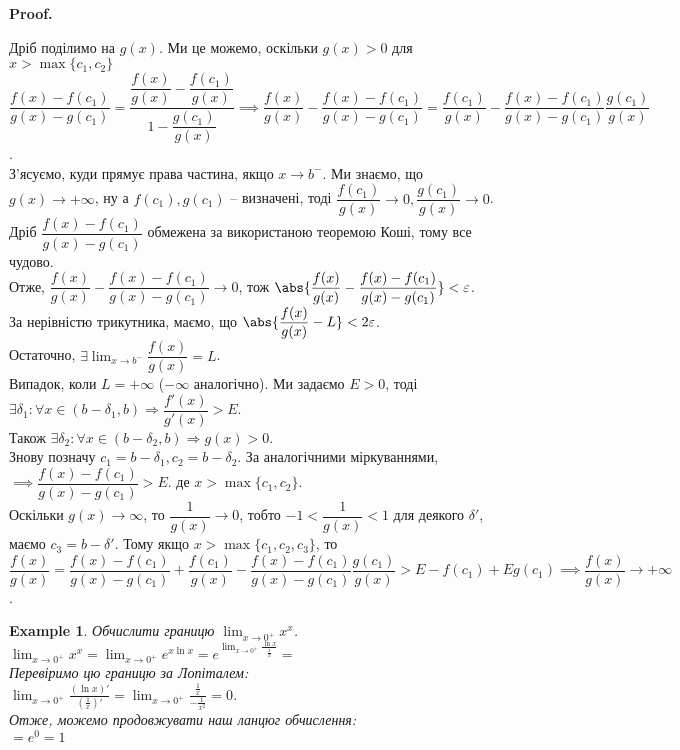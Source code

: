 \documentclass[a4paper, 14pt]{article}
\makeatletter
\def\qed{$\blacksquare$}
\theoremstyle{theoremdd}
\theoremstyle{theoremdd}
\theoremstyle{theoremdd}
\theoremstyle{theoremdd}
\newtheorem{example}[theorem]{Example}
\theoremstyle{theoremdd}
\theoremstyle{theoremdd}
\theoremstyle{theoremdd}
\theoremstyle{theoremdd}
\renewenvironment{proof}[1][Proof.\\]{\par
\pushQED{\hfill \qed}%
\normalfont \topsep6\p@\@plus6\p@\relax
\trivlist
\item\relax
{\bfseries
#1\@addpunct{.}}\hspace\labelsep\ignorespaces
}{%
\popQED\endtrivlist\@endpefalse
}
\makeatother
\begin{document}
\begin{proof}
Дріб поділимо на $g(x)$. Ми це можемо, оскільки $g(x) > 0$ для $x > \max \{c_1,c_2\}$\\
$\dfrac{f(x)-f(c_1)}{g(x)-g(c_1)} = \dfrac{\dfrac{f(x)}{g(x)} - \dfrac{f(c_1)}{g(x)}}{1 - \dfrac{g(c_1)}{g(x)}} \implies \dfrac{f(x)}{g(x)} - \dfrac{f(x)-f(c_1)}{g(x)-g(c_1)} = \dfrac{f(c_1)}{g(x)} - \dfrac{f(x)-f(c_1)}{g(x)-g(c_1)} \dfrac{g(c_1)}{g(x)}$.\\
З'ясуємо, куди прямує права частина, якщо $x \to b^-$. Ми знаємо, що $g(x) \to +\infty$, ну а $f(c_1),g(c_1)$ -- визначені, тоді $\dfrac{f(c_1)}{g(x)} \to 0, \dfrac{g(c_1)}{g(x)} \to 0$. Дріб $\dfrac{f(x)-f(c_1)}{g(x)-g(c_1)}$ обмежена за використаною теоремою Коші, тому все чудово.\\
Отже, $\dfrac{f(x)}{g(x)} - \dfrac{f(x)-f(c_1)}{g(x)-g(c_1)} \to 0$, тож $\abs{\dfrac{f(x)}{g(x)} - \dfrac{f(x)-f(c_1)}{g(x)-g(c_1)}} < \varepsilon$.\\
За нерівністю трикутника, маємо, що $\abs{\dfrac{f(x)}{g(x)} - L} < 2\varepsilon$.\\
Остаточно, $\exists \displaystyle\lim_{x \to b^-} \dfrac{f(x)}{g(x)} = L$.
\bigskip \\
Випадок, коли $L = +\infty$ ($-\infty$ аналогічно). Ми задаємо $E > 0$, тоді $\exists \delta_1: \forall x \in (b-\delta_1,b) \Rightarrow \dfrac{f'(x)}{g'(x)} > E$.\\
Також $\exists \delta_2: \forall x \in (b-\delta_2, b) \Rightarrow g(x) > 0$.\\
Знову позначу $c_1 = b-\delta_1,c_2 = b-\delta_2$. За аналогічними міркуваннями, $\implies \dfrac{f(x)-f(c_1)}{g(x)-g(c_1)} > E$. де $x > \max \{c_1,c_2\}$.\\
Оскільки $g(x) \to \infty$, то $\dfrac{1}{g(x)} \to 0$, тобто $-1 < \dfrac{1}{g(x)} < 1$ для деякого $\delta'$, маємо $c_3 = b-\delta'$. Тому якщо $x > \max\{c_1,c_2,c_3\}$, то\\
$\dfrac{f(x)}{g(x)} = \dfrac{f(x)-f(c_1)}{g(x)-g(c_1)} + \dfrac{f(c_1)}{g(x)} - \dfrac{f(x)-f(c_1)}{g(x)-g(c_1)} \dfrac{g(c_1)}{g(x)} > E - f(c_1) + Eg(c_1) \implies \dfrac{f(x)}{g(x)} \to +\infty$.
\end{proof}

\begin{example}
Обчислити границю $\displaystyle \lim_{x \to 0^+} x^x$.\\
$\displaystyle \lim_{x \to 0^+} x^x = \lim_{x \to 0^+} e^{x \ln x} = e^{\displaystyle \lim_{x \to 0^+} \frac{\ln x}{\frac{1}{x}}} \boxed{=}$\\
Перевіримо цю границю за Лопіталем:\\
$\displaystyle \lim_{x \to 0^+} \frac{(\ln x)'}{\left(\frac{1}{x}\right)'} = \lim_{x \to 0^+} \frac{\frac{1}{x}}{-\frac{1}{x^2}} = 0$.\\
Отже, можемо продовжувати наш ланцюг обчислення:\\
$\boxed{=} e^0 = 1$
\end{example}
\end{document}
